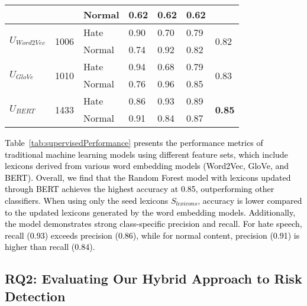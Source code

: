 \begin{table}
\begin{center}
\begin{tabular}{|l|l|lllll|}
 &  & \multicolumn{1}{l|}{Normal} & \multicolumn{1}{l|}{0.62} & \multicolumn{1}{l|}{0.62} & \multicolumn{1}{l|}{0.62} &  \\ \hline
\multirow{2}{*}{$U_{Word2Vec}$} & \multirow{2}{*}{1006} & \multicolumn{1}{l|}{Hate} & \multicolumn{1}{l|}{0.90} & \multicolumn{1}{l|}{0.70} & \multicolumn{1}{l|}{0.79} & \multirow{2}{*}{0.82} \\ \cline{3-6}
 &  & \multicolumn{1}{l|}{Normal} & \multicolumn{1}{l|}{0.74} & \multicolumn{1}{l|}{0.92} & \multicolumn{1}{l|}{0.82} &  \\ \hline
\multirow{2}{*}{$U_{GloVe}$} & \multirow{2}{*}{1010} & \multicolumn{1}{l|}{Hate} & \multicolumn{1}{l|}{0.94} & \multicolumn{1}{l|}{0.68} & \multicolumn{1}{l|}{0.79} & \multirow{2}{*}{0.83} \\ \cline{3-6}
 &  & \multicolumn{1}{l|}{Normal} & \multicolumn{1}{l|}{0.76} & \multicolumn{1}{l|}{0.96} & \multicolumn{1}{l|}{0.85} &  \\ \hline
\multirow{2}{*}{$U_{BERT}$} & \multirow{2}{*}{1433} & \multicolumn{1}{l|}{Hate} & \multicolumn{1}{l|}{0.86} & \multicolumn{1}{l|}{0.93} & \multicolumn{1}{l|}{0.89} & \multirow{2}{*}{\textbf{0.85}} \\ \cline{3-6}
 &  & \multicolumn{1}{l|}{Normal} & \multicolumn{1}{l|}{0.91} & \multicolumn{1}{l|}{0.84} & \multicolumn{1}{l|}{0.87} & \\ \hline
\end{tabular}%
\end{center}
\end{table}


\textcolor{black}{Table~\ref{tab:supervisedPerformance} presents the performance metrics of traditional machine learning models using different feature sets, which include lexicons derived from various word embedding models (Word2Vec, GloVe, and BERT). Overall, we find that the Random Forest model with lexicons updated through BERT achieves the highest accuracy at 0.85, outperforming other classifiers. When using only the seed lexicons $S_{lexicons}$, accuracy is lower compared to the updated lexicons generated by the word embedding models. Additionally, the model demonstrates strong class-specific precision and recall. For hate speech, recall (0.93) exceeds precision (0.86), while for normal content, precision (0.91) is higher than recall (0.84).}

\subsection{RQ2: Evaluating Our Hybrid Approach to Risk Detection}

